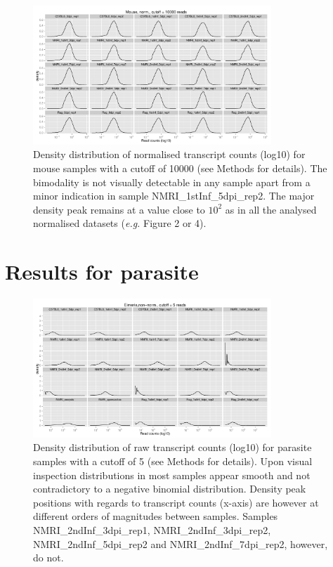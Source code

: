 \documentclass{article}
\begin{document}
\begin{figure}[h]
\begin{center}
\includegraphics[width=0.8\textwidth]{distributions_normmouse10000}
\caption{Density distribution of normalised transcript counts (log10)
  for mouse samples with a cutoff of 10000 (see Methods for
  details). The bimodality is not visually detectable in any sample
  apart from a minor indication in sample
  NMRI\_1stInf\_5dpi\_rep2. The major density peak remains at a value
  close to $10^2$ as in all the analysed normalised datasets
  (\textit{e.g.} Figure 2 or 4).}
\end{center}
\end{figure}



\section{Results for parasite}

\begin{figure}[h]
\begin{center}
\includegraphics[width=0.8\textwidth]{distributions_Ef5}
\caption{Density distribution of raw transcript counts (log10) for
  parasite samples with a cutoff of 5 (see Methods for details). Upon
  visual inspection distributions in most samples appear smooth and
  not contradictory to a negative binomial distribution. Density peak
  positions with regards to transcript counts (x-axis) are however at
  different orders of magnitudes between samples. Samples
  NMRI\_2ndInf\_3dpi\_rep1, NMRI\_2ndInf\_3dpi\_rep2,
  NMRI\_2ndInf\_5dpi\_rep2 and NMRI\_2ndInf\_7dpi\_rep2, however, do
  not.}
\end{center}
\end{figure}
\end{document}
